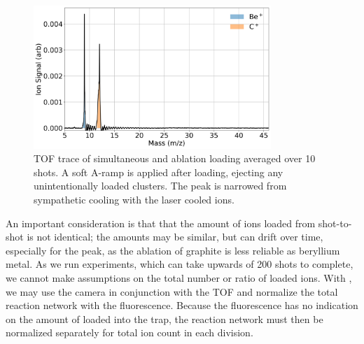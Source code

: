 \begin{figure}[H]
	\centering
	\includegraphics[width=0.8\textwidth]{images/Be_C_TOF.png}
	\caption{TOF trace of simultaneous  and  ablation loading averaged over 10 shots. A soft A-ramp is applied after loading, ejecting any unintentionally loaded  clusters. The  peak is narrowed from sympathetic cooling with the laser cooled  ions.}
	\label{fig: Be C TOF}
\end{figure}

An important consideration is that that the amount of ions loaded from shot-to-shot is not identical; the amounts may be similar, but can drift over time, especially for the  peak, as the ablation of graphite is less reliable as beryllium metal. As we run experiments, which can take upwards of 200 shots to complete, we cannot make assumptions on the total number or ratio of loaded ions. With , we may use the camera in conjunction with the TOF and normalize the total  reaction network with the fluorescence. Because the  fluorescence has no indication on the amount of  loaded into the trap, the  reaction network must then be normalized separately for total ion count in each division.